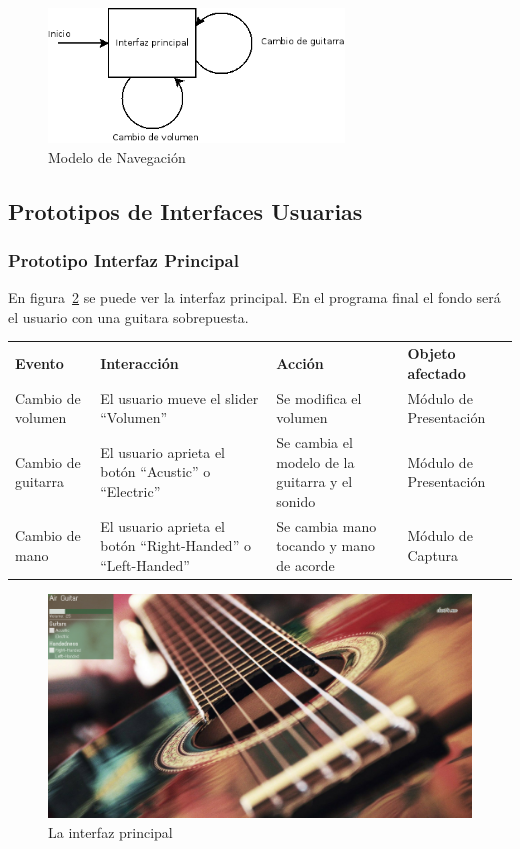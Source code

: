\documentclass[a4paper,10pt]{article}
\begin{document}
\begin{figure}[hb]
        \centering
        \includegraphics[width=0.7\textwidth]{../imagenes/modelo_de_navegacion.png}
        \caption{Modelo de Navegación}
        \label{fig:navegacion}
\end{figure}
\subsection{Prototipos de Interfaces Usuarias}
\subsubsection{Prototipo Interfaz Principal}
En figura~\ref{fig:ui} se puede ver la interfaz principal. En el programa final
el fondo será el usuario con una guitara sobrepuesta.

\begin{tabularx}{\textwidth}{X X X X}
        \textbf{Evento} & \textbf{Interacción} & \textbf{Acción} & \textbf{Objeto afectado} \\
        Cambio de volumen & El usuario mueve el slider ``Volumen'' & Se
        modifica el volumen & Módulo de Presentación \\
        Cambio de guitarra & El usuario aprieta el botón ``Acustic'' o
        ``Electric'' & Se cambia el modelo de la guitarra y el sonido & Módulo
        de Presentación \\
        Cambio de mano & El usuario aprieta el botón ``Right-Handed'' o
        ``Left-Handed'' & Se cambia mano tocando y mano de acorde & Módulo
        de Captura \\


\end{tabularx}
\begin{figure}[hb]
        \centering
        \includegraphics[width=\textwidth]{../imagenes/ui.png}
        \caption{La interfaz principal}
        \label{fig:ui}
\end{figure}
\newpage
\end{document}
